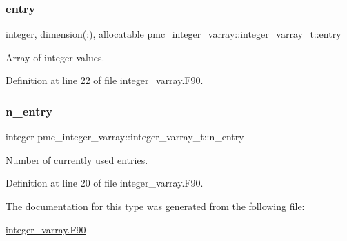 \subsubsection{\texorpdfstring{entry}{entry}}
{\footnotesize\ttfamily integer, dimension(\+:), allocatable pmc\+\_\+integer\+\_\+varray\+::integer\+\_\+varray\+\_\+t\+::entry}



Array of integer values. 



Definition at line 22 of file integer\+\_\+varray.\+F90.

\mbox{\label{structpmc__integer__varray_1_1integer__varray__t_a244e71cc84b0d31643b20b00d7687277}} 
\subsubsection{\texorpdfstring{n\+\_\+entry}{n\_entry}}
{\footnotesize\ttfamily integer pmc\+\_\+integer\+\_\+varray\+::integer\+\_\+varray\+\_\+t\+::n\+\_\+entry}



Number of currently used entries. 



Definition at line 20 of file integer\+\_\+varray.\+F90.



The documentation for this type was generated from the following file\+:\begin{DoxyCompactItemize}
\item 
\mbox{\hyperlink{integer__varray_8_f90}{integer\+\_\+varray.\+F90}}\end{DoxyCompactItemize}
